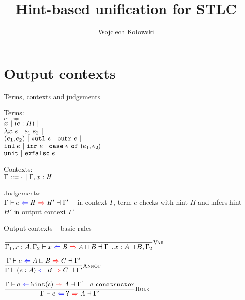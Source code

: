 \documentclass{beamer}
\title{Hint-based unification for STLC}
\author{Wojciech Kołowski}
\date{}
\begin{document}
\frame{\titlepage}

\section{Output contexts}

\begin{frame}{Terms, contexts and judgements}

Terms: \\
$e ::=$ \\
\qquad $x \ |\  (e : H) \ |\  $ \\
\qquad $\lambda x.\, e \ |\  e_1\ e_2 \ |\ $ \\
\qquad $(e_1, e_2) \ |\  \texttt{outl}\ e \ |\  \texttt{outr}\ e \ |\ $ \\
\qquad $\texttt{inl}\ e \ |\  \texttt{inr}\ e \ |\  \texttt{case}\ e\ \texttt{of}\ (e_1, e_2) \ |\ $ \\
\qquad $\texttt{unit} \ |\  \texttt{exfalso}\ e$

\vspace{1em}

Contexts: \\
$\Gamma ::= \cdot \ |\  \Gamma, x : H$

\vspace{2em}

Judgements: \\
$\fulloutctx{\Gamma}{e}{H}{H'}{\Gamma'}$ -- in context $\Gamma$, term $e$ checks with hint $H$ and infers hint $H'$ in output context $\Gamma'$

\end{frame}

\begin{frame}{Output contexts -- basic rules}

\begin{center}
  $\infrule[Var]{}{\fulloutctx{\Gamma_1, x : A, \Gamma_2}{x}{B}{\combinehints{A}{B}}{\Gamma_1, x : \combinehints{A}{B}, \Gamma_2}}$

  \vspace{2em}

  $\infrule[Annot]{\outctx{e}{\combinehints{A}{B}}{C}}{\outctx{\annot{e}{A}}{B}{C}}$

  \vspace{2em}

  $\infrule[Hole]{\outctx{e}{\hintfor{e}}{A} \quad \sidecond{e\ \texttt{constructor}}}{\outctx{e}{\Hole}{A}}$
\end{center}

\end{frame}
\end{document}
